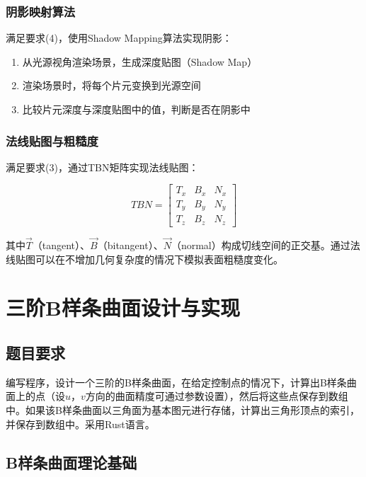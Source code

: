 \documentclass[12pt,a4paper]{article}
\begin{document}
\subsubsection{阴影映射算法}

满足要求(4)，使用Shadow Mapping算法实现阴影：

\begin{enumerate}
    \item 从光源视角渲染场景，生成深度贴图（Shadow Map）
    \item 渲染场景时，将每个片元变换到光源空间
    \item 比较片元深度与深度贴图中的值，判断是否在阴影中
\end{enumerate}

\subsubsection{法线贴图与粗糙度}

满足要求(3)，通过TBN矩阵实现法线贴图：

\begin{equation}
TBN = \begin{bmatrix}
T_x & B_x & N_x \\
T_y & B_y & N_y \\
T_z & B_z & N_z
\end{bmatrix}
\end{equation}

其中$\vec{T}$（tangent）、$\vec{B}$（bitangent）、$\vec{N}$（normal）构成切线空间的正交基。通过法线贴图可以在不增加几何复杂度的情况下模拟表面粗糙度变化。


\newpage
\section{三阶B样条曲面设计与实现}

\subsection{题目要求}

编写程序，设计一个三阶的B样条曲面，在给定控制点的情况下，计算出B样条曲面上的点（设$u$，$v$方向的曲面精度可通过参数设置），然后将这些点保存到数组中。如果该B样条曲面以三角面为基本图元进行存储，计算出三角形顶点的索引，并保存到数组中。采用Rust语言。

\subsection{B样条曲面理论基础}
\end{document}
